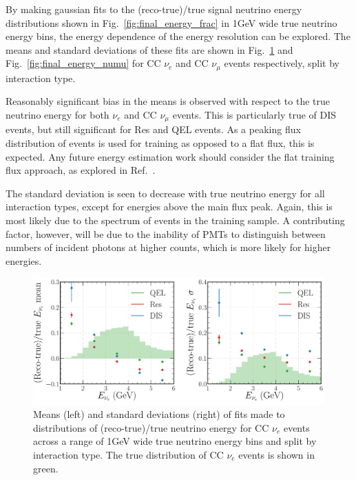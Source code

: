 By making gaussian fits to the (reco-true)/true signal neutrino energy distributions shown in
Fig.~\ref{fig:final_energy_frac} in \unit{1}{GeV} wide true neutrino energy bins, the energy
dependence of the energy resolution can be explored. The means and standard deviations of these
fits are shown in Fig.~\ref{fig:final_energy_nuel} and Fig.~\ref{fig:final_energy_numu} for CC
$\nu_{e}$ and CC $\nu_{\mu}$ events respectively, split by interaction type.

Reasonably significant bias in the means is observed with respect to the true neutrino energy for
both $\nu_{e}$ and CC $\nu_{\mu}$ events. This is particularly true of DIS events, but still
significant for Res and QEL events. As a peaking flux distribution of events is used for training
as opposed to a flat flux, this is expected. Any future energy estimation work should consider the
flat training flux approach, as explored in Ref.~\cite{baldi2019}.

The standard deviation is seen to decrease with true neutrino energy for all interaction types,
except for energies above the main flux peak. Again, this is most likely due to the spectrum of
events in the training sample. A contributing factor, however, will be due to the inability of
PMTs to distinguish between numbers of incident photons at higher counts, which is more likely for
higher energies.

\begin{figure} %
    \includegraphics[width=\textwidth]{diagrams/7-results/final_energy_nuel.pdf}
    \caption[Means and standard deviations of fits to $\nu_{e}$ energy distributions]
    {Means (left) and standard deviations (right) of fits made to distributions of
        (reco-true)/true neutrino energy for CC $\nu_{e}$ events across a range of \unit{1}{GeV}
        wide true neutrino energy bins and split by interaction type. The true distribution of CC
        $\nu_{e}$ events is shown in green.}
    \label{fig:final_energy_nuel}
\end{figure}

